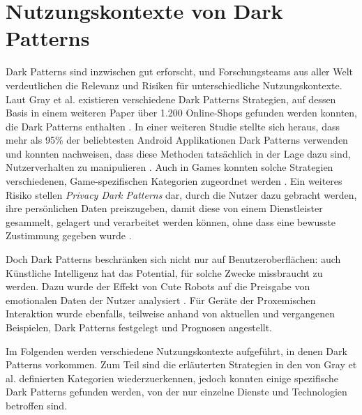 \documentclass[a4paper]{article}
\begin{document}
\section{Nutzungskontexte von Dark Patterns} %
\label{sec:nutzungskontexte_von_dark_patterns}
Dark Patterns sind inzwischen gut erforscht, und Forschungsteams aus aller Welt verdeutlichen die Relevanz und Risiken für unterschiedliche Nutzungskontexte. Laut Gray et al. existieren verschiedene Dark Patterns Strategien, auf dessen Basis in einem weiteren Paper über 1.200 Online-Shops gefunden werden konnten, die Dark Patterns enthalten \cite{gray}\cite{mathur}. In einer weiteren Studie stellte sich heraus, dass mehr als 95\% der beliebtesten Android Applikationen Dark Patterns verwenden und konnten nachweisen, dass diese Methoden tatsächlich in der Lage dazu sind, Nutzerverhalten zu manipulieren \cite{geronimo}. Auch in Games konnten solche Strategien verschiedenen, Game-spezifischen Kategorien zugeordnet werden \cite{zagal}. Ein weiteres Risiko stellen \textit{Privacy Dark Patterns} dar, durch die Nutzer dazu gebracht werden, ihre persönlichen Daten preiszugeben, damit diese von einem Dienstleister gesammelt, gelagert und verarbeitet werden können, ohne dass eine bewusste Zustimmung gegeben wurde \cite{boesch}. 

Doch Dark Patterns beschränken sich nicht nur auf Benutzeroberflächen: auch Künstliche Intelligenz hat das Potential, für solche Zwecke missbraucht zu werden. Dazu wurde
der Effekt von \glqq Cute Robots\grqq{} auf die Preisgabe von emotionalen Daten der Nutzer analysiert \cite{lacey}. Für Geräte der Proxemischen Interaktion wurde ebenfalls, teilweise anhand von aktuellen und vergangenen Beispielen, Dark Patterns festgelegt und Prognosen angestellt.

Im Folgenden werden verschiedene Nutzungskontexte aufgeführt, in denen Dark Patterns vorkommen. Zum Teil sind die erläuterten Strategien in den von Gray et al. definierten Kategorien wiederzuerkennen, jedoch konnten einige spezifische Dark Patterns gefunden werden, von der nur einzelne Dienste und Technologien betroffen sind.
\end{document}
